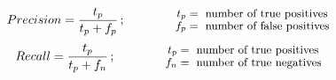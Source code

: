 \begin{align} 
   Precision=  \frac{t_p}{t_p+f_p}\,;\qquad
\qquad\parbox{4.0cm}{\footnotesize$\begin{aligned} t_p &= \text{ number of true positives}\\[-1.0ex] f_p &= \text{ number of false positives}\end{aligned}$}
   \label{eq:1}
\end{align}
\begin{align}
   Recall =  \frac{t_p}{t_p+f_n} \,;\qquad
\qquad\parbox{4.0cm}{\footnotesize$\begin{aligned} t_p &= \text{ number of true positives}\\[-1.0ex] f_n &= \text{ number of true negatives}\end{aligned}$}
   \label{eq:2}
\end{align}

